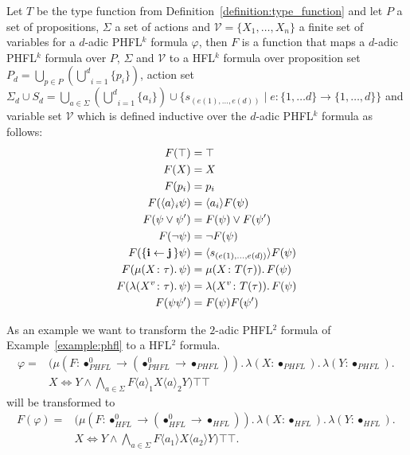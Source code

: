 \begin{definition}
    \label{definition:formula_function}
    Let $T$ be the type function from Definition~\ref{definition:type_function} and let $P$ a set of propositions,
    $\Sigma$ a set of actions and $\mathcal{V} = \{X_1, \dots, X_n\}$ a finite set of variables for a $d$-adic
    PHFL$^k$ formula $\varphi$, then $F$ is a function that maps a $d$-adic PHFL$^k$ formula over $P$, $\Sigma$ and
    $\mathcal{V}$ to a HFL$^k$ formula over proposition set $P_d = \underset{p \in P}{\bigcup}(\underset{i =
    1}{\overset{d}{\bigcup}} \{p_i\})$, action set $\Sigma_d \cup S_d = \underset{a \in \Sigma}{\bigcup}(\underset{i =
    1}{\overset{d}{\bigcup}} \{a_i\}) \cup \{s_{(e(1), \dots, e(d))} \mid e: \{1, \dots d\} \rightarrow \{1, \dots,
    d\}\}$ and variable set $\mathcal{V}$ which is defined inductive over the $d$-adic PHFL$^k$ formula as follows:
    \begin{align*}
        F(\top) &= \top\\
        F(X) &= X\\
        F(p_i) &= p_i\\
        F(\langle a \rangle_i \psi) &= \langle a_i \rangle F(\psi) \\
        F(\psi \vee \psi') &= F(\psi) \vee F(\psi') \\
        F(\neg \psi) &= \neg F(\psi) \\
        F(\{\emph{i} \leftarrow \emph{j}\,\} \psi) &= \langle s_{(e(1), \dots, e(d))} \rangle F(\psi)  \\
        F(\mu (X \colon \tau).\,\psi) &= \mu (X \colon T(\tau)).\,F(\psi) \\
        F(\lambda (X^v \colon \tau).\, \psi) &= \lambda (X^v \colon T(\tau)).\, F(\psi) \\
        F(\psi{\psi'}) &= F(\psi)F({\psi'})
    \end{align*}
\end{definition}

\begin{example}
    As an example we want to transform the $2$-adic PHFL$^2$ formula of Example~\ref{example:phfl} to a HFL$^2$ formula.
    \begin{align*}
        \varphi = &(\mu (F \colon \bullet_{PHFL}^0 \rightarrow (\bullet_{PHFL}^0 \rightarrow \bullet_{PHFL})).\,
        \lambda (X \colon \bullet_{PHFL}).\, \lambda (Y \colon \bullet_{PHFL}).\, \\&X \Leftrightarrow Y \wedge
        \underset{a \in \Sigma}{\bigwedge} F \langle a \rangle_1 X \langle a \rangle_2 Y)\top \top
    \end{align*}
    will be transformed to
\begin{align*}
    F(\varphi) = &(\mu (F \colon \bullet_{HFL}^0 \rightarrow (\bullet_{HFL}^0 \rightarrow \bullet_{HFL})).\,
    \lambda (X \colon \bullet_{HFL}).\, \lambda (Y \colon \bullet_{HFL}).\, \\&X \Leftrightarrow Y \wedge \underset{a
    \in \Sigma}{\bigwedge} F \langle a_1 \rangle X \langle a_2 \rangle Y)\top \top.
\end{align*}
\end{example}


